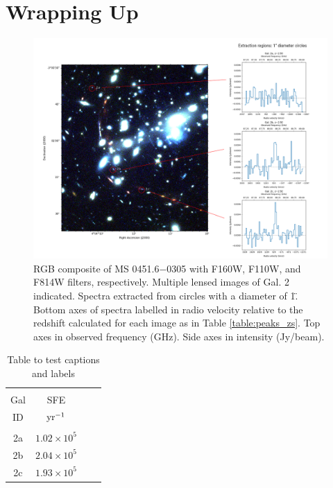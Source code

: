 \documentclass[11pt]{article}
\begin{document}
\section*{Wrapping Up}


\begin{figure}[!htbp]
    \hspace{-1cm}
    \includegraphics[width=1.1\linewidth]{../figs/final.png}
    \caption{RGB composite of MS 0451.6−0305 with F160W, F110W, and F814W filters, respectively. Multiple lensed images of Gal. 2 indicated. Spectra extracted from circles with a diameter of 1\". Bottom axes of spectra labelled in radio velocity relative to the redshift calculated for each image as in Table \ref{table:peaks_zs}. Top axes in observed frequency (GHz). Side axes in intensity (Jy/beam).}
    \label{fig:final_oteo}
\end{figure}

\begin{table}[!htbp]
\centering
\begin{tabular}{cccc}
\hline \\[-0.25cm]
Gal & SFE \\
ID  & $\rm{yr^{-1}}$ \\[0.1cm]
\hline \\[-0.25cm]
2a & $1.02\times 10^{5}$ \\
2b & $2.04\times 10^{5}$ \\
2c & $1.93\times 10^{5}$ \\
\hline
\end{tabular}
\caption{Table to test captions and labels}
\label{table:4}
\end{table}

\nocite{*}

\end{document}
